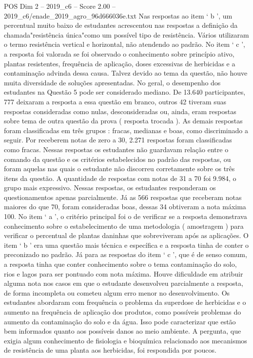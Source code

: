 \begin{textsample}{POS Dim 2 – 2019\_c6 – Score 2.00 – 2019\_c6/enade\_2019\_agro\_96d666036e.txt}
Nas respostas ao item ‘ b ’, um percentual muito baixo de estudantes acrescentou nas respostas a definição da chamada"resistência única"como um possível tipo de resistência.
Vários utilizaram o termo resistência vertical e horizontal, não atendendo ao padrão.
No item ‘ c ’, a resposta foi valorada se foi observado o conhecimento sobre princípio ativo, plantas resistentes, frequência de aplicação, doses excessivas de herbicidas e a contaminação advinda dessa causa.
Talvez devido ao tema da questão, não houve muita diversidade de soluções apresentadas.
No geral, o desempenho dos estudantes na Questão 5 pode ser considerado mediano.
De 13.640 participantes, 777 deixaram a resposta a essa questão em branco, outros 42 tiveram suas respostas consideradas como nulas, desconsideradas ou, ainda, eram respostas sobre tema de outra questão da prova ( resposta trocada ).
As demais respostas foram classificadas em três grupos : fracas, medianas e boas, como discriminado a seguir.
Por receberem notas de zero a 30, 2.271 respostas foram classificadas como fracas.
Nessas respostas os estudantes não guardavam relação entre o comando da questão e os critérios estabelecidos no padrão das respostas, ou foram aquelas nas quais o estudante não discorreu corretamente sobre os três itens da questão.
A quantidade de respostas com notas de 31 a 70 foi 9.984, o grupo mais expressivo.
Nessas respostas, os estudantes responderam os questionamentos apenas parcialmente.
Já as 566 respostas que receberam notas maiores do que 70, foram consideradas boas, dessas 34 obtiveram a nota máxima 100.
No item ‘ a ’, o critério principal foi o de verificar se a resposta demonstrava conhecimento sobre o estabelecimento de uma metodologia ( amostragem ) para verificar o percentual de plantas daninhas que sobreviveram após as aplicações.
O item ‘ b ’ era uma questão mais técnica e específica e a resposta tinha de conter o preconizado no padrão.
Já para as respostas do item ‘ c ’, que é de senso comum, a resposta tinha que conter conhecimento sobre o tema contaminação do solo, rios e lagos para ser pontuado com nota máxima.
Houve dificuldade em atribuir alguma nota nos casos em que o estudante desenvolveu parcialmente a resposta, de forma incompleta ou cometeu algum erro menor no desenvolvimento.
Os estudantes abordaram com frequência o problema da superdose de herbicidas e o aumento na frequência de aplicação dos produtos, como possíveis problemas do aumento da contaminação do solo e da água.
Isso pode caracterizar que estão bem informados quanto aos possíveis danos ao meio ambiente.
A pergunta, que exigia algum conhecimento de fisiologia e bioquímica relacionado aos mecanismos de resistência de uma planta aos herbicidas, foi respondida por poucos.

\end{textsample}
